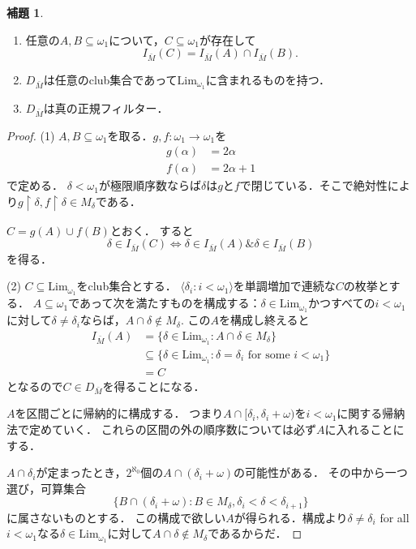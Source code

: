 \documentclass[uplatex]{jsarticle}
\newcommand{\AND}{\mathbin{\&}}
\newcommand{\restrict}{\upharpoonright}
\newcommand{\Lim}{\mathrm{Lim}}
\newcommand{\Limone}{\mathrm{Lim}_{\omega_1}}
\newcommand{\seq}[1]{{\langle#1\rangle}}
\renewcommand\subset{\subseteq}
\theoremstyle{definition}
\newtheorem{lem}[thm]{補題}
\begin{document}
	\begin{lem}
		\begin{enumerate}
			\item 任意の$A, B \subset \omega_1$について，$C \subset \omega_1$が存在して
			\[
			I_{\bar{M}}(C) = I_{\bar{M}}(A) \cap I_{\bar{M}}(B).
			\]
			\item $D_{\bar{M}}$は任意のclub集合であって$\Limone$に含まれるものを持つ．
			\item $D_{\bar{M}}$は真の正規フィルター．
		\end{enumerate}
	\end{lem}
	\begin{proof}
		(1) $A, B \subset \omega_1$を取る．$g, f \colon \omega_1 \to \omega_1$を
		\begin{align*}
		g(\alpha) &= 2 \alpha \\
		f(\alpha) &= 2 \alpha + 1
		\end{align*}
		で定める．
		$\delta < \omega_1$が極限順序数ならば$\delta$は$g$と$f$で閉じている．そこで絶対性により$g \restrict \delta, f \restrict \delta \in M_\delta$である．
		
		$C = g(A) \cup f(B)$とおく．
		すると
		\[
		\delta \in I_{\bar{M}}(C) \iff \delta \in I_{\bar{M}}(A) \AND \delta \in I_{\bar{M}}(B)
		\]
		を得る．
		
		(2) $C \subset \Lim_{\omega_1}$をclub集合とする．
		$\seq{\delta_i : i < \omega_1}$を単調増加で連続な$C$の枚挙とする．
		$A \subset \omega_1$であって次を満たすものを構成する：$\delta \in \Limone$かつすべての$i < \omega_1$に対して$\delta \ne \delta_i$ならば，$A \cap \delta \not \in M_\delta$.
		この$A$を構成し終えると
		\begin{align*}
			I_{\bar{M}}(A) &= \{ \delta \in \Limone : A \cap \delta \in M_\delta \} \\
			& \subset \{ \delta \in \Limone : \delta = \delta_i \text{ for some $i<\omega_1$}  \} \\
			& = C
		\end{align*}
		となるので$C \in D_{\bar{M}}$を得ることになる．
		
		$A$を区間ごとに帰納的に構成する．
		つまり$A \cap [\delta_i, \delta_i + \omega)$を$i < \omega_1$に関する帰納法で定めていく．
		これらの区間の外の順序数については必ず$A$に入れることにする．
		
		$A \cap \delta_i$が定まったとき，$2^{\aleph_0}$個の$A \cap (\delta_i + \omega)$の可能性がある．
		その中から一つ選び，可算集合
		\[
		\{ B \cap (\delta_i + \omega) : B \in M_\delta, \delta_i < \delta < \delta_{i+1} \}
		\]
		に属さないものとする．
		この構成で欲しい$A$が得られる．構成より$\delta \ne \delta_i$ for all $i < \omega_1$なる$\delta \in \Limone$に対して$A \cap \delta \not \in M_\delta$であるからだ．
		

\end{proof}
\end{document}
